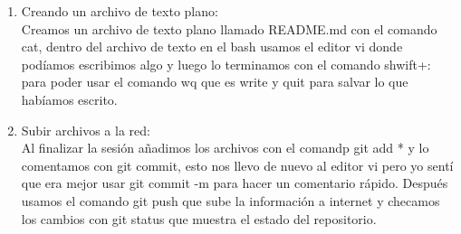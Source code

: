 \documentclass[letterpaper, 12pt, oneside]{article}
\begin{document}
\begin{enumerate}
\begin{enumerate}
\begin{enumerate}
			\item Creando un archivo de texto plano:\\
			Creamos un archivo de texto plano llamado README.md con el comando cat, dentro del archivo de texto en el bash usamos el editor vi donde pod\'iamos escribimos algo y luego lo terminamos con el comando shwift+: para poder usar el comando wq que es write y quit para salvar lo que hab\'iamos escrito.\\
			
			\item Subir archivos a la red:\\
			Al finalizar la sesi\'on añadimos los archivos con el comandp git add * y lo comentamos con git commit, esto nos llevo de nuevo al editor vi pero yo sent\'i que era mejor usar git commit -m para hacer un comentario r\'apido. Despu\'es usamos el comando git push que sube la informaci\'on a internet y checamos los cambios con git status que muestra el estado del repositorio.
			\end{enumerate}
		\end{enumerate}
	\end{enumerate}
\end{document}
